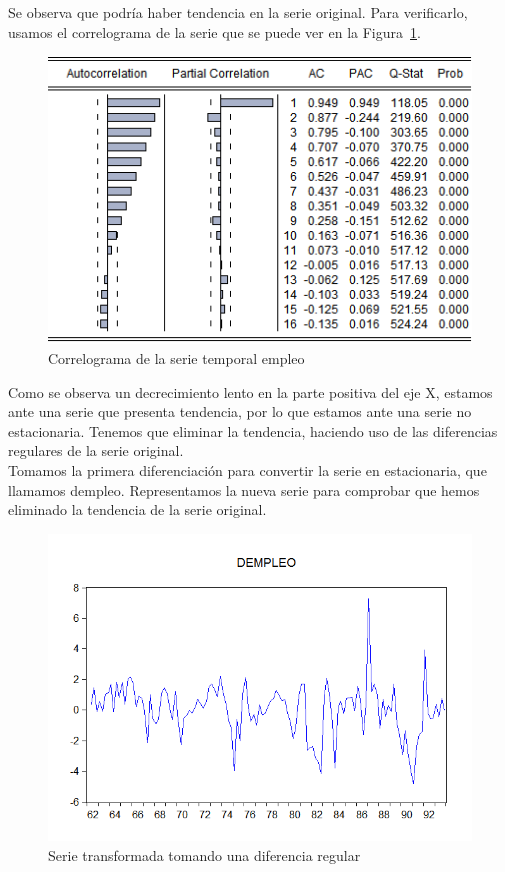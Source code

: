 \documentclass[12pt,a4paper,twoside,openright,titlepage,final]{article}
\begin{document}
Se observa que podría haber tendencia en la serie original. Para verificarlo, usamos el correlograma de la serie que se puede ver en la Figura~\ref{fig:correlograma-empleo}.\\
 
\begin{figure}[tbph!]
	\centering
	\includegraphics[width=0.7\linewidth]{imagenes/empleo/correlograma-empleo.png}
	\caption{Correlograma de la serie temporal empleo}
	\label{fig:correlograma-empleo}
\end{figure}

Como se observa un decrecimiento lento en la parte positiva del eje X, estamos ante una serie que presenta tendencia, por lo que estamos ante una serie no estacionaria. Tenemos que eliminar la tendencia, haciendo uso de las diferencias regulares de la serie original.\\

Tomamos la primera diferenciación para convertir la serie en estacionaria, que llamamos dempleo. Representamos la nueva serie para comprobar que hemos eliminado la tendencia de la serie original.  \\

\begin{figure}[tbph!]
	\centering
	\includegraphics[width=0.8\linewidth]{imagenes/empleo/empleo-diferenciada.png}
	\caption{Serie transformada tomando una diferencia regular}
	\label{fig:empleo-diferenciada}
\end{figure}
\end{document}
